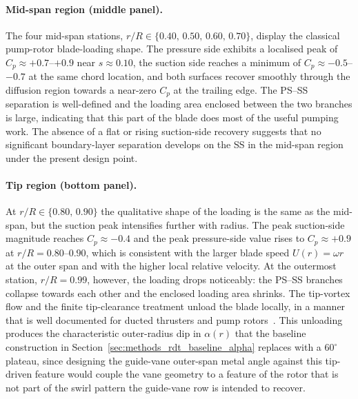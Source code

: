 \paragraph{Mid-span region (middle panel).}
The four mid-span stations, $r/R\in\{0.40,\,0.50,\,0.60,\,0.70\}$,
display the classical pump-rotor blade-loading shape. The pressure side
exhibits a localised peak of $C_p\approx +0.7$--$+0.9$ near
$s\approx 0.10$, the suction side reaches a minimum of
$C_p\approx -0.5$--$-0.7$ at the same chord location, and both surfaces
recover smoothly through the diffusion region towards a near-zero
$C_p$ at the trailing edge. The PS--SS separation is well-defined and
the loading area enclosed between the two branches is large, indicating
that this part of the blade does most of the useful pumping work. The
absence of a flat or rising suction-side recovery suggests that no
significant boundary-layer separation develops on the SS in the
mid-span region under the present design point.
 
\paragraph{Tip region (bottom panel).}
At $r/R\in\{0.80,\,0.90\}$ the qualitative shape of the loading is the
same as the mid-span, but the suction peak intensifies further with
radius. The peak suction-side magnitude reaches $C_p\approx -0.4$ and
the peak pressure-side value rises to $C_p\approx +0.9$ at
$r/R=0.80$--$0.90$, which is consistent with the larger blade speed
$U(r)=\omega r$ at the outer span and with the higher local relative
velocity. At the outermost station, $r/R=0.99$, however, the loading
drops noticeably: the PS--SS branches collapse towards each other and
the enclosed loading area shrinks. The tip-vortex flow and the
finite tip-clearance treatment unload the blade locally, in a manner
that is well documented for ducted thrusters and pump
rotors~\cite{Verdijck2025}. This unloading produces the
characteristic outer-radius dip in $\alpha(r)$ that the baseline
construction in
Section~\ref{sec:methods_rdt_baseline_alpha} replaces with a
$60^\circ$ plateau, since designing the guide-vane outer-span metal
angle against this tip-driven feature would couple the vane geometry
to a feature of the rotor that is not part of the swirl pattern the
guide-vane row is intended to recover.
 
